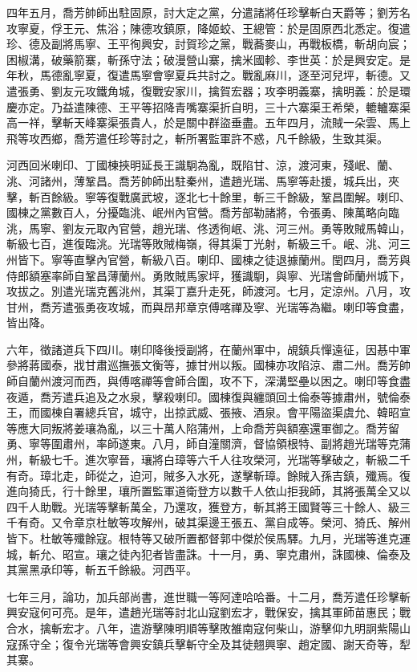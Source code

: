 \begin{pinyinscope}
四年五月，喬芳帥師出駐固原，討大定之黨，分遣諸將任珍擊斬白天爵等；劉芳名攻寧夏，俘王元、焦浴；陳德攻鎮原，降姬蛟、王總管：於是固原西北悉定。復遣珍、德及副將馬寧、王平徇興安，討賀珍之黨，戰蕎麥山，再戰板橋，斬胡向宸；困椒溝，破藥箭寨，斬孫守法；破漫營山寨，擒米國軫、李世英：於是興安定。是年秋，馬德亂寧夏，復遣馬寧會寧夏兵共討之。戰亂麻川，逐至河兒坪，斬德。又遣張勇、劉友元攻鐵角城，復戰安家川，擒賀宏器；攻李明義寨，擒明義：於是環慶亦定。乃益遣陳德、王平等招降青嘴寨渠折自明，三十六寨渠王希榮，轆轤寨渠高一祥，擊斬天峰寨渠張貴人，於是關中群盜垂盡。五年四月，流賊一朵雲、馬上飛等攻西鄉，喬芳遣任珍等討之，斬所署監軍許不惑，凡千餘級，生致其渠。

河西回米喇印、丁國棟挾明延長王識駉為亂，既陷甘、涼，渡河東，殘岷、蘭、洮、河諸州，薄鞏昌。喬芳帥師出駐秦州，遣趙光瑞、馬寧等赴援，城兵出，夾擊，斬百餘級。寧等復戰廣武坡，逐北七十餘里，斬三千餘級，鞏昌圍解。喇印、國棟之黨數百人，分擾臨洮、岷州內官營。喬芳部勒諸將，令張勇、陳萬略向臨洮，馬寧、劉友元取內官營，趙光瑞、佟透徇岷、洮、河三州。勇等敗賊馬韓山，斬級七百，進復臨洮。光瑞等敗賊梅嶺，得其渠丁光射，斬級三千。岷、洮、河三州皆下。寧等直擊內官營，斬級八百。喇印、國棟之徒退據蘭州。閏四月，喬芳與侍郎額塞率師自鞏昌薄蘭州。勇敗賊馬家坪，獲識駉，與寧、光瑞會師蘭州城下，攻拔之。別遣光瑞克舊洮州，其渠丁嘉升走死，師渡河。七月，定涼州。八月，攻甘州，喬芳遣張勇夜攻城，而與昂邦章京傅喀禪及寧、光瑞等為繼。喇印等食盡，皆出降。

六年，徵諸道兵下四川。喇印降後授副將，在蘭州軍中，覘鎮兵憚遠征，因惎中軍參將蔣國泰，戕甘肅巡撫張文衡等，據甘州以叛。國棟亦攻陷涼、肅二州。喬芳帥師自蘭州渡河而西，與傅喀禪等會師合圍，攻不下，深溝堅壘以困之。喇印等食盡夜遁，喬芳遣兵追及之水泉，擊殺喇印。國棟復與纏頭回土倫泰等據肅州，號倫泰王，而國棟自署總兵官，城守，出掠武威、張掖、酒泉。會平陽盜渠虞允、韓昭宣等應大同叛將姜瓖為亂，以三十萬人陷蒲州，上命喬芳與額塞還軍御之。喬芳留勇、寧等圍肅州，率師遂東。八月，師自潼關濟，督協領根特、副將趙光瑞等克蒲州，斬級七千。進次寧晉，瓖將白璋等六千人往攻榮河，光瑞等擊破之，斬級二千有奇。璋北走，師從之，迫河，賊多入水死，遂擊斬璋。餘賊入孫吉鎮，殲焉。復進向猗氏，行十餘里，瓖所置監軍道衛登方以數千人依山拒我師，其將張萬全又以四千人助戰。光瑞等擊斬萬全，乃還攻，獲登方，斬其將王國賢等三十餘人、級三千有奇。又令章京杜敏等攻解州，破其渠邊王張五、黨自成等。榮河、猗氏、解州皆下。杜敏等殲餘寇。根特等又破所置都督郭中傑於侯馬驛。九月，光瑞等進克運城，斬允、昭宣。瓖之徒內犯者皆盡誅。十一月，勇、寧克肅州，誅國棟、倫泰及其黨黑承印等，斬五千餘級。河西平。

七年三月，論功，加兵部尚書，進世職一等阿達哈哈番。十二月，喬芳遣任珍擊斬興安寇何可亮。是年，遣趙光瑞等討北山寇劉宏才，戰保安，擒其軍師苗惠民；戰合水，擒斬宏才。八年，遣游擊陳明順等擊敗雒南寇何柴山，游擊仰九明詗紫陽山寇孫守全；復令光瑞等會興安鎮兵擊斬守全及其徒翹興寧、趙定國、謝天奇等，犁其寨。


\end{pinyinscope}

